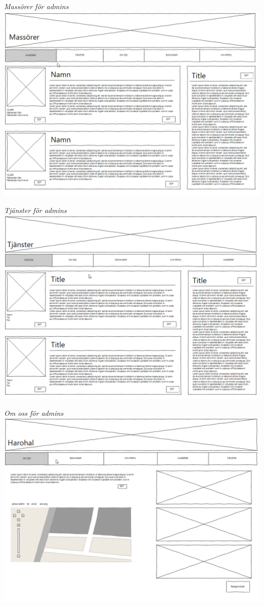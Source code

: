 \documentclass[11pt, titlepage, oneside, a4paper]{article}	%
\begin{document}
\begin{center}
    \textit{Massörer för admins}
    \includegraphics[width=1\textwidth]{../Bilder/Wireframe/a_massorer}
    
    \textit{Tjänster för admins}
    \includegraphics[width=1\textwidth]{../Bilder/Wireframe/a_tjanster}
    \newpage
    
    \textit{Om oss för admins}
    \includegraphics[width=1\textwidth]{../Bilder/Wireframe/a_om_oss}
    

\end{center}
\end{document}
